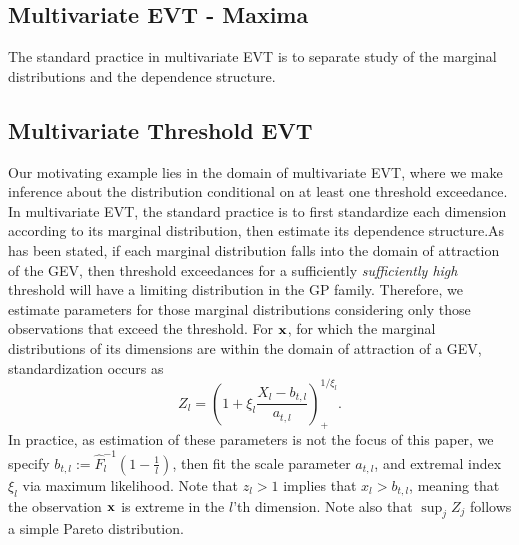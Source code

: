 \subsection{Multivariate EVT - Maxima}
The standard practice in multivariate EVT is to separate study of the marginal distributions and the
  dependence structure\needcite.



\subsection{Multivariate Threshold EVT}







Our motivating example lies in the domain of multivariate EVT, where we make inference about the
  distribution conditional on at least one threshold exceedance.  In multivariate EVT, the standard
  practice is to first standardize each dimension according to its marginal distribution, then
  estimate its dependence structure.\findcite  As has been stated, if each marginal distribution falls
  into the domain of attraction of the GEV, then threshold exceedances for a sufficiently
  \emph{sufficiently high} threshold will have a limiting distribution in the GP family\cite{beirlant2006}.
  Therefore, we estimate parameters for those marginal distributions considering only those
  observations that exceed the threshold.  For ${\bf x}$, for which the marginal distributions of its
  dimensions are within the domain of attraction of a GEV, standardization occurs as
  \begin{equation}
    Z_l = \left(1 + \xi_l\frac{X_l - b_{t,l}}{a_{t,l}}\right)_{+}^{1/\xi_l}.
  \end{equation}
  In practice, as estimation of these parameters is not the focus of this paper, we specify
  $b_{t,l} := \hat{F}_l^{-1}\left(1 - \frac{1}{l}\right)$, then fit the scale parameter $a_{t,l}$,
  and extremal index $\xi_l$ via maximum likelihood.  Note that $z_l > 1$ implies that $x_l > b_{t,l}$,
  meaning that the observation ${\bf x}$ is extreme in the $l$'th dimension.  Note also that
  $\sup_j Z_j$ follows a simple Pareto distribution.

